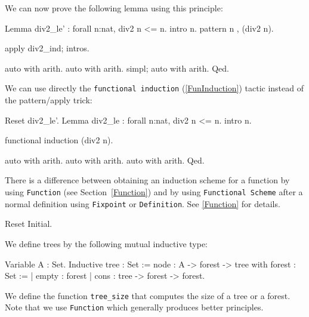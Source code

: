 \begin{coq_example*}
We can now prove the following lemma using this principle:


\begin{coq_example*}
Lemma div2_le' : forall n:nat, div2 n <= n.
intro n.
 pattern n , (div2 n).
\end{coq_example*}


\begin{coq_example}
apply div2_ind; intros.
\end{coq_example}

\begin{coq_example*}
auto with arith.
auto with arith.
simpl; auto with arith.
Qed.
\end{coq_example*}

We can use directly the \texttt{functional induction}
(\ref{FunInduction}) tactic instead of the pattern/apply trick:

\begin{coq_example*}
Reset div2_le'.
Lemma div2_le : forall n:nat, div2 n <= n.
intro n.
\end{coq_example*}

\begin{coq_example}
functional induction (div2 n).
\end{coq_example}

\begin{coq_example*}
auto with arith.
auto with arith.
auto with arith.
Qed.
\end{coq_example*}

\Rem There is a difference between obtaining an induction scheme for a
function by using \texttt{Function} (see Section~\ref{Function}) and by
using \texttt{Functional Scheme} after a normal definition using
\texttt{Fixpoint} or \texttt{Definition}. See \ref{Function} for
details.



\begin{coq_eval}
Reset Initial.
\end{coq_eval}

We define trees by the following mutual inductive type:

\begin{coq_example*}
Variable A : Set.
Inductive tree : Set :=
    node : A -> forest -> tree
with forest : Set :=
  | empty : forest
  | cons : tree -> forest -> forest.
\end{coq_example*}

We define the function \texttt{tree\_size} that computes the size
of a tree or a forest. Note that we use \texttt{Function} which
generally produces better principles.


\end{coq_example*}
